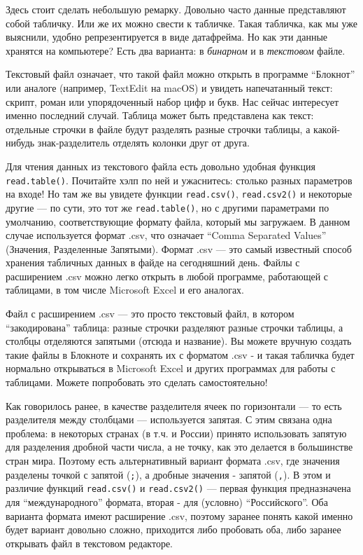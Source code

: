 \documentclass[
]{book}
\begin{document}
Здесь стоит сделать небольшую ремарку. Довольно часто данные представляют собой табличку. Или же их можно свести к табличке. Такая табличка, как мы уже выяснили, удобно репрезентируется в виде датафрейма. Но как эти данные хранятся на компьютере? Есть два варианта: в \emph{бинарном} и в \emph{текстовом} файле.

Текстовый файл означает, что такой файл можно открыть в программе ``Блокнот'' или аналоге (например, TextEdit на macOS) и увидеть напечатанный текст: скрипт, роман или упорядоченный набор цифр и букв. Нас сейчас интересует именно последний случай. Таблица может быть представлена как текст: отдельные строчки в файле будут разделять разные строчки таблицы, а какой-нибудь знак-разделитель отделять колонки друг от друга.

Для чтения данных из текстового файла есть довольно удобная функция \texttt{read.table()}. Почитайте хэлп по ней и ужаснитесь: столько разных параметров на входе! Но там же вы увидете функции \texttt{read.csv()}, \texttt{read.csv2()} и некоторые другие --- по сути, это тот же \texttt{read.table()}, но с другими параметрами по умолчанию, соответствующие формату файла, который мы загружаем. В данном случае используется формат .csv, что означает ``Comma Separated Values'' (Значения, Разделенные Запятыми). Формат .csv --- это самый известный способ хранения табличных данных в файде на сегодняшний день. Файлы с расширением .csv можно легко открыть в любой программе, работающей с таблицами, в том числе Microsoft Excel и его аналогах.

Файл с расширением .csv --- это просто текстовый файл, в котором ``закодирована'' таблица: разные строчки разделяют разные строчки таблицы, а столбцы отделяются запятыми (отсюда и название). Вы можете вручную создать такие файлы в Блокноте и сохранять их с форматом .csv - и такая табличка будет нормально открываться в Microsoft Excel и других программах для работы с таблицами. Можете попробовать это сделать самостоятельно!

Как говорилось ранее, в качестве разделителя ячеек по горизонтали --- то есть разделителя между столбцами --- используется запятая. С этим связана одна проблема: в некоторых странах (в т.ч. и России) принято использовать запятую для разделения дробной части числа, а не точку, как это делается в большинстве стран мира. Поэтому есть альтернативный вариант формата .csv, где значения разделены точкой с запятой (\texttt{;}), а дробные значения - запятой (\texttt{,}). В этом и различие функций \texttt{read.csv()} и \texttt{read.csv2()} --- первая функция предназначена для ``международного'' формата, вторая - для (условно) ``Российского''. Оба варианта формата имеют расширение .csv, поэтому заранее понять какой именно будет вариант довольно сложно, приходится либо пробовать оба, либо заранее открывать файл в текстовом редакторе.
\end{document}
